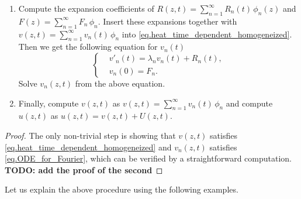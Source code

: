 \begin{theorem}
\begin{enumerate}
\begin{equation}
\begin{aligned}
            &\ \phi(a) \cos \alpha-L \phi^{\prime}(a) \sin \alpha=0,
            \\
            &\ \phi(b) \cos \beta+L \phi^{\prime}(b) \sin \beta=0
        \end{aligned}
        \right\}.
    \end{equation}
    \item Compute the expansion coefficients of $R(z, t) = \sum_{n = 1}^\infty R_n(t)\, \phi_n(z)$ and $F(z) = \sum_{n = 1}^\infty F_n\, \phi_n$. Insert these expansions together with $v(z, t) = \sum_{n = 1}^\infty v_n(t)\, \phi_n$ into \eqref{eq.heat_time_dependent_homogeneized}. Then we get the following equation for $v_n(t)$ 
    \begin{equation}\label{eq.ODE_for_Fourier}
        \left\{\begin{aligned} 
            &v'_n(t) = \lambda_n v_n(t) + R_n(t), 
            \\
            &v_n(0)=F_n.
        \end{aligned}\right.
    \end{equation}
    Solve $v_n(z, t)$ from the above equation.
    \item Finally, compute $v(z, t)$ as $v(z, t) = \sum_{n = 1}^\infty v_n(t)\, \phi_n$ and compute $u(z, t)$ as $u(z, t) = v(z, t) + U(z, t)$.
    \end{enumerate}
\end{theorem}
\begin{proof}
    The only non-trivial step is showing that $v(z, t)$ satisfies \eqref{eq.heat_time_dependent_homogeneized} and $v_n(z, t)$ satisfies \eqref{eq.ODE_for_Fourier}, which can be verified by a straightforward computation. \textbf{TODO: add the proof of the second}
\end{proof}

Let us explain the above procedure using the following examples.

